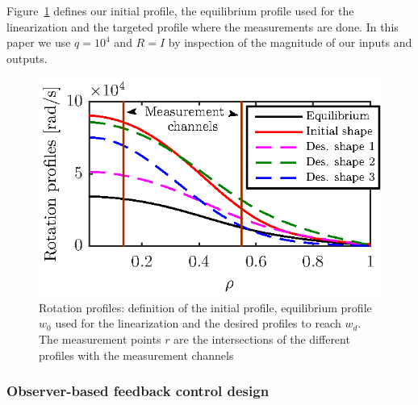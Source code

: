 \documentclass[12pt,lot, lof]{puthesis}
\begin{document}
Figure~\ref{fig:rot11} defines our initial profile, the equilibrium profile used for the linearization and the targeted profile where the measurements are done.
In this paper we use $q=10^{4}$ and $R=I$ by inspection of the magnitude of our inputs and outputs.
\begin{figure}
	\centering
\includegraphics[width=0.9 \linewidth]{fig11}
\caption{Rotation profiles: definition of the initial profile, equilibrium profile $w_0$ used for the linearization and the desired profiles to reach $w_d$. The measurement points $r$ are the intersections of the different profiles with the measurement channels}
\label{fig:rot11}
\end{figure}




\subsubsection{Observer-based feedback control design} 
\end{document}
